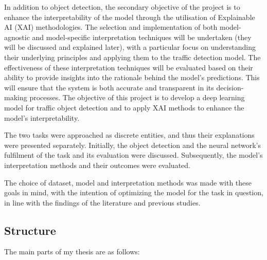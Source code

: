 In addition to object detection, the secondary objective of the project is to enhance the interpretability of the
model through the utilisation of Explainable AI (XAI) me\-tho\-do\-lo\-gies.
The selection and implementation of both model-agnostic and model-specific interpretation techniques will be undertaken (they will be discussed and explained later),
with a particular focus on understanding their underlying principles and applying them to the traffic detection model.
The effectiveness of these interpretation techniques will be evaluated based on their
ability to provide insights into the rationale behind the model's predictions.
This will ensure that the system is both accurate and transparent in its decision-making processes.
The objective of this project is to develop a deep learning model for traffic object detection and to apply XAI methods to enhance the model's interpretability.

The two tasks were approached as discrete entities, and thus their explanations were presented separately.
Initially, the object detection and the neural network's fulfilment of the task and its evaluation were discussed.
Subsequently, the model's interpretation methods and their outcomes were evaluated.

The choice of dataset, model and interpretation methods was made with these goals in mind, with the intention of optimizing the model for the task in question, in line with the findings of the literature and previous studies.

\subsection{Structure}\label{subsec:Structure} %

The main parts of my thesis are as follows:


